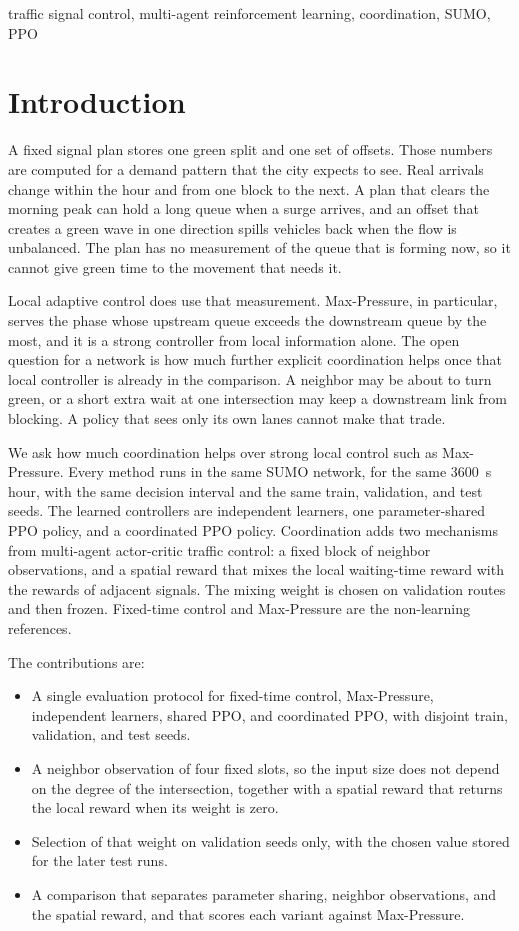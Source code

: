 \documentclass[conference]{IEEEtran}
\begin{document}
\begin{IEEEkeywords}
traffic signal control, multi-agent reinforcement learning, coordination, SUMO, PPO
\end{IEEEkeywords}

\section{Introduction}
A fixed signal plan stores one green split and one set of offsets. Those numbers are computed for a demand pattern that the city expects to see. Real arrivals change within the hour and from one block to the next. A plan that clears the morning peak can hold a long queue when a surge arrives, and an offset that creates a green wave in one direction spills vehicles back when the flow is unbalanced. The plan has no measurement of the queue that is forming now, so it cannot give green time to the movement that needs it.

Local adaptive control does use that measurement. Max-Pressure, in particular, serves the phase whose upstream queue exceeds the downstream queue by the most, and it is a strong controller from local information alone. The open question for a network is how much further explicit coordination helps once that local controller is already in the comparison. A neighbor may be about to turn green, or a short extra wait at one intersection may keep a downstream link from blocking. A policy that sees only its own lanes cannot make that trade.

We ask how much coordination helps over strong local control such as Max-Pressure. Every method runs in the same SUMO network, for the same 3600~s hour, with the same decision interval and the same train, validation, and test seeds. The learned controllers are independent learners, one parameter-shared PPO policy, and a coordinated PPO policy. Coordination adds two mechanisms from multi-agent actor-critic traffic control: a fixed block of neighbor observations, and a spatial reward that mixes the local waiting-time reward with the rewards of adjacent signals. The mixing weight is chosen on validation routes and then frozen. Fixed-time control and Max-Pressure are the non-learning references.

The contributions are:
\begin{itemize}
\item A single evaluation protocol for fixed-time control, Max-Pressure, independent learners, shared PPO, and coordinated PPO, with disjoint train, validation, and test seeds.
\item A neighbor observation of four fixed slots, so the input size does not depend on the degree of the intersection, together with a spatial reward that returns the local reward when its weight is zero.
\item Selection of that weight on validation seeds only, with the chosen value stored for the later test runs.
\item A comparison that separates parameter sharing, neighbor observations, and the spatial reward, and that scores each variant against Max-Pressure.
\end{itemize}
\end{document}
